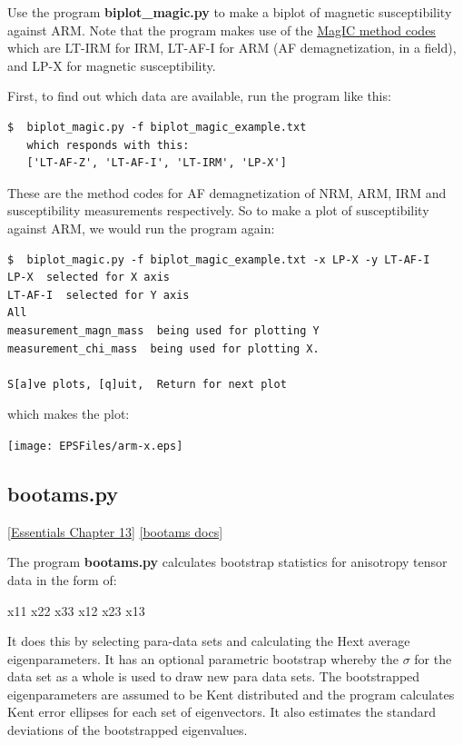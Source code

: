 \documentclass[11pt]{book}
\begin{document}
{{{Use the program {\bf biplot\_magic.py} to make a biplot of  magnetic susceptibility against ARM.  Note that the program makes use of the \href{#method_codes}{MagIC method codes} which are LT-IRM for IRM, LT-AF-I for ARM (AF demagnetization, in a field), and LP-X for magnetic susceptibility.

First, to find out which data are available, run the program like this:

\begin{verbatim}
$  biplot_magic.py -f biplot_magic_example.txt
   which responds with this:
   ['LT-AF-Z', 'LT-AF-I', 'LT-IRM', 'LP-X']
   \end{verbatim}

These are the method codes for  AF demagnetization of NRM, ARM, IRM and susceptibility measurements respectively.  So to make a plot of
susceptibility against ARM, we would run the program again:


\begin{verbatim}
$  biplot_magic.py -f biplot_magic_example.txt -x LP-X -y LT-AF-I
LP-X  selected for X axis
LT-AF-I  selected for Y axis
All
measurement_magn_mass  being used for plotting Y
measurement_chi_mass  being used for plotting X.

S[a]ve plots, [q]uit,  Return for next plot
\end{verbatim}

\noindent which makes the plot:

  \texttt{[image: EPSFiles/arm-x.eps]}



\subsection{bootams.py}
\href{http://earthref.org/MAGIC/books/Tauxe/Essentials/WebBook3ch13.html#ch13}{[Essentials Chapter 13]}
\href{https://github.com/PmagPy/PmagPy/blob/master/programs/bootams.py}{[bootams docs]}

The program {\bf bootams.py} calculates bootstrap statistics for anisotropy tensor data in the form of:

x11 x22 x33 x12 x23 x13

It does this by selecting para-data sets and calculating the Hext average eigenparameters.
It has an optional parametric bootstrap whereby the $\sigma$ for the data set as a whole is used to draw new para data sets.    The bootstrapped eigenparameters are assumed to be Kent distributed and the program calculates Kent error ellipses for each set of eigenvectors.  It also estimates  the standard deviations of the bootstrapped eigenvalues.

}}}
\end{document}
